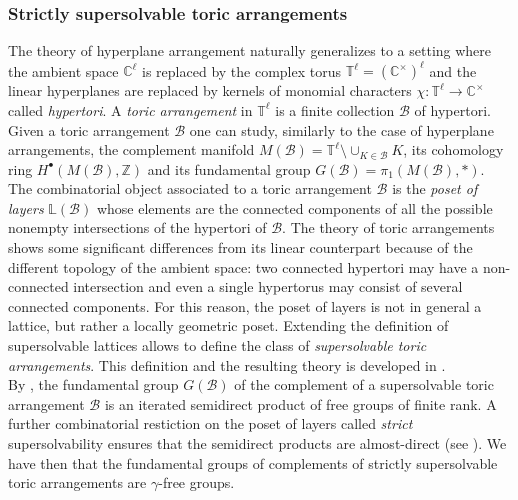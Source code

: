 \documentclass{amsart}
\theoremstyle{plain}
\theoremstyle{definition}
\numberwithin{theorem}{section}
\numberwithin{equation}{section}
\newcommand{\Z}{\mathbb Z}
\begin{document}
\subsubsection{Strictly supersolvable toric arrangements}
The theory of hyperplane arrangement naturally generalizes to a setting where the ambient space $\mathbb C^\ell$ is replaced by the complex torus $\mathbb T^\ell = (\mathbb C^\times)^\ell$ and the linear hyperplanes are replaced by kernels of monomial characters $\chi : \mathbb T^\ell \to \mathbb C^\times$ called \emph{hypertori}. A \emph{toric arrangement} in $\mathbb T^\ell$ is a finite collection $\mathcal B$ of hypertori. Given a toric arrangement $\mathcal B$ one can study, similarly to the case of hyperplane arrangements, the complement manifold $M(\mathcal B) = \mathbb T^\ell \setminus \cup_{K \in \mathcal B}K$, its cohomology ring $H^\bullet(M(\mathcal B), \Z)$ and its fundamental group $G(\mathcal B) = \pi_1(M(\mathcal B), *)$. \\
The combinatorial object associated to a toric arrangement $\mathcal B$ is the \emph{poset of layers} $\mathbb L(\mathcal B)$ whose elements are the connected components of all the possible nonempty intersections of the hypertori of $\mathcal B$. 
The theory of toric arrangements shows some significant differences from its linear counterpart because of the different topology of the ambient space: two connected hypertori may have a non-connected intersection and even a single hypertorus may consist of several connected components. For this reason, the poset of layers is not in general a lattice, but rather a locally geometric poset. Extending the definition of supersolvable lattices allows to define the class of \emph{supersolvable toric arrangements}. This definition and the resulting theory is developed in \cite{BD24}. \\
\noindent
By \cite[Theorem 3.4.3]{BD24}, the fundamental group $G(\mathcal B)$ of the complement of a supersolvable toric arrangement $\mathcal B$ is an iterated semidirect product of free groups of finite rank. A further combinatorial restiction on the poset of layers called \emph{strict} supersolvability ensures that the semidirect products are almost-direct (see \cite[Theorem 5.3.4 and Theorem 5.3.10]{BD24}). We have then that the fundamental groups of complements of strictly supersolvable toric arrangements are $\gamma$-free groups.
\end{document}

